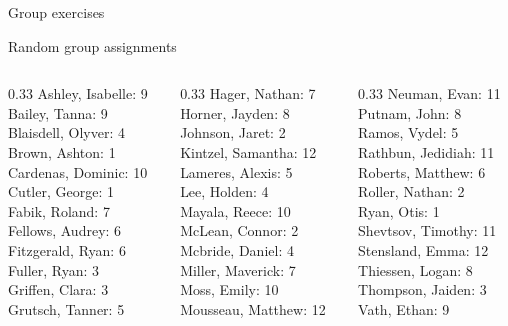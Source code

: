 \documentclass[10pt]{beamer}
\begin{document}
\begin{frame}[standout]
Group exercises
\end{frame}

\begin{frame}{Random group assignments}
\begin{columns}
\begin{column}{0.33\textwidth}
Ashley, Isabelle: 9 \\ 
Bailey, Tanna: 9 \\ 
Blaisdell, Olyver: 4 \\ 
Brown, Ashton: 1 \\ 
Cardenas, Dominic: 10 \\ 
Cutler, George: 1 \\ 
Fabik, Roland: 7 \\ 
Fellows, Audrey: 6 \\ 
Fitzgerald, Ryan: 6 \\ 
Fuller, Ryan: 3 \\ 
Griffen, Clara: 3 \\ 
Grutsch, Tanner: 5 \\\end{column}
\begin{column}{0.33\textwidth}
Hager, Nathan: 7 \\ 
Horner, Jayden: 8 \\ 
Johnson, Jaret: 2 \\ 
Kintzel, Samantha: 12 \\ 
Lameres, Alexis: 5 \\ 
Lee, Holden: 4 \\ 
Mayala, Reece: 10 \\ 
McLean, Connor: 2 \\ 
Mcbride, Daniel: 4 \\ 
Miller, Maverick: 7 \\ 
Moss, Emily: 10 \\ 
Mousseau, Matthew: 12 \\\end{column}
\begin{column}{0.33\textwidth}
Neuman, Evan: 11 \\ 
Putnam, John: 8 \\ 
Ramos, Vydel: 5 \\ 
Rathbun, Jedidiah: 11 \\ 
Roberts, Matthew: 6 \\ 
Roller, Nathan: 2 \\ 
Ryan, Otis: 1 \\ 
Shevtsov, Timothy: 11 \\ 
Stensland, Emma: 12 \\ 
Thiessen, Logan: 8 \\ 
Thompson, Jaiden: 3 \\ 
Vath, Ethan: 9 \\\end{column}
\end{columns}
\end{frame}
\end{document}
